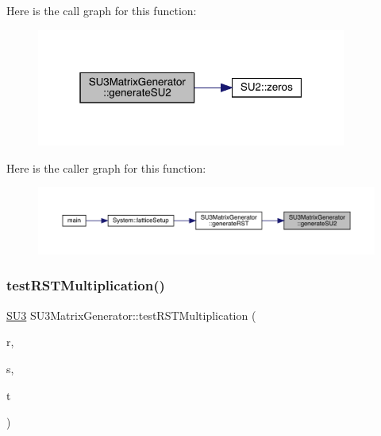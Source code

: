 Here is the call graph for this function\+:\nopagebreak
\begin{figure}[H]
\begin{center}
\leavevmode
\includegraphics[width=289pt]{class_s_u3_matrix_generator_aa4e04caff654a1df7c43280b85f359bc_cgraph}
\end{center}
\end{figure}
Here is the caller graph for this function\+:\nopagebreak
\begin{figure}[H]
\begin{center}
\leavevmode
\includegraphics[width=350pt]{class_s_u3_matrix_generator_aa4e04caff654a1df7c43280b85f359bc_icgraph}
\end{center}
\end{figure}
\mbox{\label{class_s_u3_matrix_generator_a05a57d1d429dc2c31d79ccf2de5efeee}} 
\subsubsection{\texorpdfstring{testRSTMultiplication()}{testRSTMultiplication()}}
{\footnotesize\ttfamily \mbox{\hyperlink{class_s_u3}{S\+U3}} S\+U3\+Matrix\+Generator\+::test\+R\+S\+T\+Multiplication (\begin{DoxyParamCaption}\item[{\mbox{\hyperlink{class_s_u2}{S\+U2}}}]{r,  }\item[{\mbox{\hyperlink{class_s_u2}{S\+U2}}}]{s,  }\item[{\mbox{\hyperlink{class_s_u2}{S\+U2}}}]{t }\end{DoxyParamCaption})\hspace{0.3cm}{\ttfamily [inline]}}

